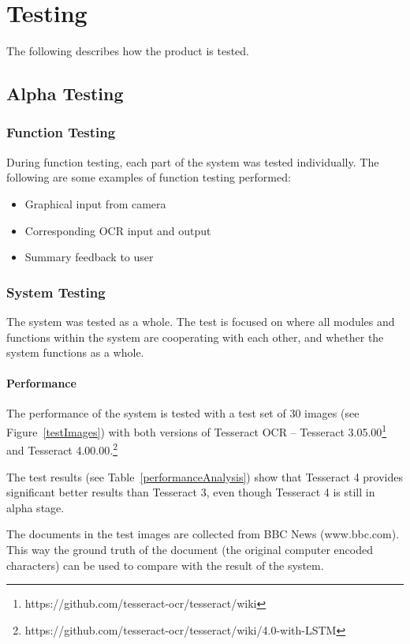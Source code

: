 \chapter{Testing}

	The following describes how the product is tested.

	\section{Alpha Testing}
		\subsection{Function Testing}

		During function testing, each part of the system was tested individually.
		The following are some examples of function testing performed:
		\begin{itemize}
			\item Graphical input from camera
			\item Corresponding OCR input and output
			\item Summary feedback to user
		\end{itemize}

		\subsection{System Testing}

		The system was tested as a whole. The test is focused on where all modules and functions within the system are cooperating with each other, and whether the system functions as a whole.
		
		\subsubsection{Performance}
		The performance of the system is tested with a test set of 30 images (see Figure~\ref{testImages}) with both versions of Tesseract OCR – Tesseract 3.05.00\footnote{https://github.com/tesseract-ocr/tesseract/wiki} and Tesseract 4.00.00.\footnote{https://github.com/tesseract-ocr/tesseract/wiki/4.0-with-LSTM}
		
		The test results (see Table~\ref{performanceAnalysis}) show that Tesseract 4 provides significant better results than Tesseract 3, even though Tesseract 4 is still in alpha stage.
		
		The documents in the test images are collected from BBC News (www.bbc.com). This way the ground truth of the document (the original computer encoded characters) can be used to compare with the result of the system.
		
